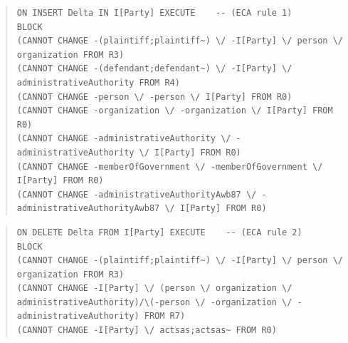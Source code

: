 \documentclass[10pt,a4paper]{report}              %
\theoremstyle{plain}\theorembodyfont{\rmfamily}\newtheorem{definition}{Definition}[section]
\theoremstyle{plain}\theorembodyfont{\rmfamily}\newtheorem{designrule}[definition]{Requirement}
\begin{document}
\begin{quote}
\begin{verbatim}
ON INSERT Delta IN I[Party] EXECUTE    -- (ECA rule 1)
BLOCK
(CANNOT CHANGE -(plaintiff;plaintiff~) \/ -I[Party] \/ person \/ organization FROM R3)
(CANNOT CHANGE -(defendant;defendant~) \/ -I[Party] \/ administrativeAuthority FROM R4)
(CANNOT CHANGE -person \/ -person \/ I[Party] FROM R0)
(CANNOT CHANGE -organization \/ -organization \/ I[Party] FROM R0)
(CANNOT CHANGE -administrativeAuthority \/ -administrativeAuthority \/ I[Party] FROM R0)
(CANNOT CHANGE -memberOfGovernment \/ -memberOfGovernment \/ I[Party] FROM R0)
(CANNOT CHANGE -administrativeAuthorityAwb87 \/ -administrativeAuthorityAwb87 \/ I[Party] FROM R0)
\end{verbatim}
\end{quote}
\begin{quote}
\begin{verbatim}
ON DELETE Delta FROM I[Party] EXECUTE    -- (ECA rule 2)
BLOCK
(CANNOT CHANGE -(plaintiff;plaintiff~) \/ -I[Party] \/ person \/ organization FROM R3)
(CANNOT CHANGE -I[Party] \/ (person \/ organization \/ administrativeAuthority)/\(-person \/ -organization \/ -administrativeAuthority) FROM R7)
(CANNOT CHANGE -I[Party] \/ actsas;actsas~ FROM R0)
\end{verbatim}
\end{quote}
\end{document}
